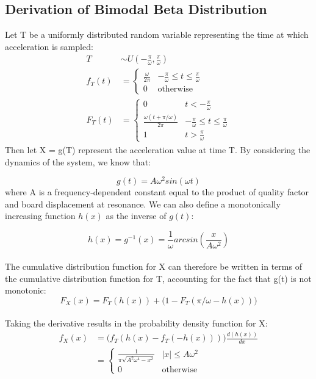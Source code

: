 \documentclass[12pt]{article}
\begin{document}
\begin{appendix}
    \subsection{Derivation of Bimodal Beta Distribution} \label{Poster_Derivation}
    Let T be a uniformly distributed random variable representing the time at which acceleration is sampled:
    \begin{align}
      T & \sim U\left(-\frac{\pi}{\omega}, \frac{\pi}{\omega}\right) \nonumber \\
      f_T(t) & =
        \begin{cases}
          \frac{\omega}{2\pi} & -\frac{\pi}{\omega} \leq t \leq \frac{\pi}{\omega}\\
          0 & \text{otherwise}
        \end{cases}\\
      F_T(t) & =
        \begin{cases}
          0 & t < -\frac{\pi}{\omega}\\
          \frac{\omega (t + \pi / \omega)}{2\pi} & -\frac{\pi}{\omega} \leq t \leq \frac{\pi}{\omega}\\
          1 & t > \frac{\pi}{\omega}
        \end{cases}
    \end{align}
    Then let X = g(T) represent the acceleration value at time T. By considering the dynamics of the system, we know that:

    \begin{equation}
      g(t) = A \omega^2 sin(\omega t)
    \end{equation}
    where A is a frequency-dependent constant equal to the product of quality factor and board displacement at resonance. We can also define a monotonically increasing function $h(x)$ as the inverse of $g(t)$:

    \begin{equation}
      h(x) = g^{-1}(x) = \frac{1}{\omega} arcsin \left(\frac{x}{A\omega^2}\right)
    \end{equation}
    \\
    The cumulative distribution function for X can therefore be written in terms of the cumulative distribution function for T, accounting for the fact that g(t) is not monotonic:
    \begin{equation}
      F_X(x) = F_T(h(x)) + \Big(1 - F_T(\pi/\omega - h(x))\Big)
    \end{equation}
    \\
    Taking the derivative results in the probability density function for X:
    \begin{align}
      f_X(x) & = \Big(f_T(h(x) - f_T(-h(x)))\Big) \frac{d(h(x))}{dx}\\
      & =
      \begin{cases}
        \frac{1}{\pi \sqrt{A^2 \omega^4 - x^2}} & |x| \leq A \omega^2\\
        0 & \text{otherwise}
      \end{cases}
    \end{align}



\end{appendix}
\end{document}

